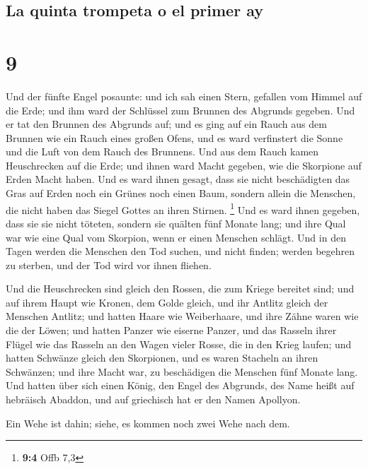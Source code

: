 \hypertarget{la-quinta-trompeta-o-el-primer-ay}{%
\subsection{La quinta trompeta o el primer
ay}\label{la-quinta-trompeta-o-el-primer-ay}}

\hypertarget{section-8}{%
\section{9}\label{section-8}}

 Und der fünfte Engel posaunte: und ich sah einen Stern,
gefallen vom Himmel auf die Erde; und ihm ward der Schlüssel zum Brunnen
des Abgrunds gegeben.  Und er tat den Brunnen des Abgrunds
auf; und es ging auf ein Rauch aus dem Brunnen wie ein Rauch eines
großen Ofens, und es ward verfinstert die Sonne und die Luft von dem
Rauch des Brunnens.  Und aus dem Rauch kamen Heuschrecken
auf die Erde; und ihnen ward Macht gegeben, wie die Skorpione auf Erden
Macht haben.  Und es ward ihnen gesagt, dass sie nicht
beschädigten das Gras auf Erden noch ein Grünes noch einen Baum, sondern
allein die Menschen, die nicht haben das Siegel Gottes an ihren Stirnen.
\footnote{\textbf{9:4} Offb 7,3}  Und es ward ihnen
gegeben, dass sie sie nicht töteten, sondern sie quälten fünf Monate
lang; und ihre Qual war wie eine Qual vom Skorpion, wenn er einen
Menschen schlägt.  Und in den Tagen werden die Menschen
den Tod suchen, und nicht finden; werden begehren zu sterben, und der
Tod wird vor ihnen fliehen.

 Und die Heuschrecken sind gleich den Rossen, die zum
Kriege bereitet sind; und auf ihrem Haupt wie Kronen, dem Golde gleich,
und ihr Antlitz gleich der Menschen Antlitz;  und hatten
Haare wie Weiberhaare, und ihre Zähne waren wie die der Löwen;
 und hatten Panzer wie eiserne Panzer, und das Rasseln
ihrer Flügel wie das Rasseln an den Wagen vieler Rosse, die in den Krieg
laufen;  und hatten Schwänze gleich den Skorpionen, und
es waren Stacheln an ihren Schwänzen; und ihre Macht war, zu beschädigen
die Menschen fünf Monate lang.  Und hatten über sich
einen König, den Engel des Abgrunds, des Name heißt auf hebräisch
Abaddon, und auf griechisch hat er den Namen Apollyon.

 Ein Wehe ist dahin; siehe, es kommen noch zwei Wehe nach
dem.

